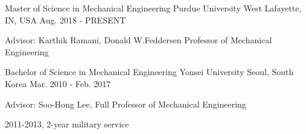 


\begin{cventries}


    \cventry
    {Master of Science in Mechanical Engineering} %
    {Purdue University} %
    {West Lafayette, IN, USA} %
    {Aug. 2018 - PRESENT} %
    { %
    \begin{cvitems}
        \item {Advisor: Karthik Ramani, Donald W.Feddersen Professor of Mechanical Engineering}
    \end{cvitems}
    }

    \cventry
    {Bachelor of Science in Mechanical Engineering} %
    {Yonsei University} %
    {Seoul, South Korea} %
    {Mar. 2010 - Feb. 2017} %
    { %
    \begin{cvitems}
        \item {Advisor: Soo-Hong Lee, Full Professor of Mechanical Engineering}
        \item {2011-2013, 2-year military service}
    \end{cvitems}
    }

\end{cventries}
